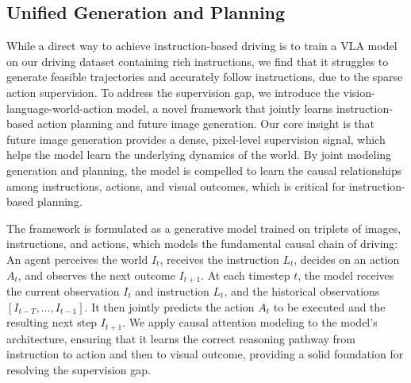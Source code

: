 \subsection{Unified Generation and Planning}
\label{sec: method_task}
While a direct way to achieve instruction-based driving is to train a VLA model on our driving dataset containing rich instructions, we find that it struggles to generate feasible trajectories and accurately follow instructions, due to the sparse action supervision.
To address the supervision gap, we introduce the vision-language-world-action model, a novel framework that jointly learns instruction-based action planning and future image generation. 
Our core insight is that future image generation provides a dense, pixel-level supervision signal, which helps the model learn the underlying dynamics of the world. 
By joint modeling generation and planning, the model is compelled to learn the causal relationships among instructions, actions, and visual outcomes, which is critical for instruction-based planning.

The framework is formulated as a generative model trained on triplets of images, instructions, and actions, which models the fundamental causal chain of driving: 
An agent perceives the world $I_t$, receives the instruction $L_t$, decides on an action $A_t$, and observes the next outcome $I_{t+1}$. 
At each timestep $t$, the model receives the current observation $I_t$ and instruction $L_t$, and the historical observations $[I_{t-T}, \dots, I_{t-1}]$. It then jointly predicts the action $A_t$ to be executed and the resulting next step $I_{t+1}$.
We apply causal attention modeling to the model's architecture, ensuring that it learns the correct reasoning pathway from instruction to action and then to visual outcome, providing a solid foundation for resolving the supervision gap.


